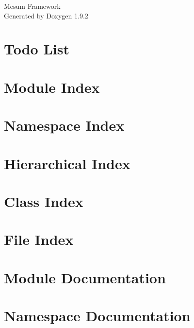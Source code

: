 \documentclass[twoside]{book}
\newcommand{\+}{\discretionary{\mbox{\scriptsize$\hookleftarrow$}}{}{}}
\newcommand{\clearemptydoublepage}{%
    \newpage{\pagestyle{empty}\cleardoublepage}%
  }
\begin{document}
  \raggedbottom
    \hypersetup{pageanchor=false,
                bookmarksnumbered=true,
                pdfencoding=unicode
               }
  \begin{titlepage}
  \vspace*{7cm}
  \begin{center}%
  {\Large Mesum Framework}\\
  \vspace*{1cm}
  {\large Generated by Doxygen 1.9.2}\\
  \end{center}
  \end{titlepage}
  \clearemptydoublepage
  \tableofcontents
  \clearemptydoublepage
  \hypersetup{pageanchor=true}
\chapter{Todo List}
\label{todo}

\chapter{Module Index}

\chapter{Namespace Index}

\chapter{Hierarchical Index}

\chapter{Class Index}

\chapter{File Index}

\chapter{Module Documentation}


\chapter{Namespace Documentation}






\end{document}
